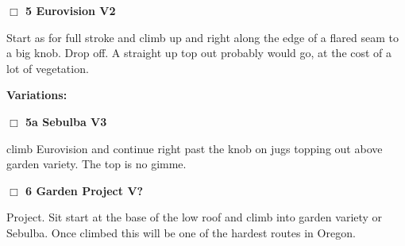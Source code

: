\begin{multicols}{2}
\needspace{2em}
\label{rt:Eurovision}
\colorbox{green!20}{
\parbox{0.95\linewidth}{
\hspace{-1ex}\textbf{$\Box$
5 Eurovision V2  
}}}
\begin{adjustwidth}{1.3em}{}			

Start as for full stroke and climb up and right along the edge of a flared seam to a big knob. Drop off. A straight up top out probably would go, at the cost of a lot of vegetation.
\end{adjustwidth}


\begin{adjustwidth}{0.5cm}{}				
\needspace{4em}
\textbf{Variations:} \newline

\needspace{2em}
\label{vr:Sebulba}
\colorbox{green!20}{
\parbox{0.95\linewidth}{
\hspace{-1ex}\textbf{$\Box$
5a Sebulba V3  \warn
}}}
\begin{adjustwidth}{1.3em}{}			

climb Eurovision and continue right past the knob on jugs topping out above garden variety. The top is no gimme.
\end{adjustwidth}



\end{adjustwidth}


\needspace{2em}
\label{rt:Garden Project}
\colorbox{black!20}{
\parbox{0.95\linewidth}{
\hspace{-1ex}\textbf{$\Box$
6 Garden Project V?  
}}}
\begin{adjustwidth}{1.3em}{}			

Project. Sit start at the base of the low roof and climb into garden variety or Sebulba. Once climbed this will be one of the hardest routes in Oregon.
\end{adjustwidth}



	\end{multicols}
\label{tp:arboretum2}
  \begin{landscape}
	
  \end{landscape}

